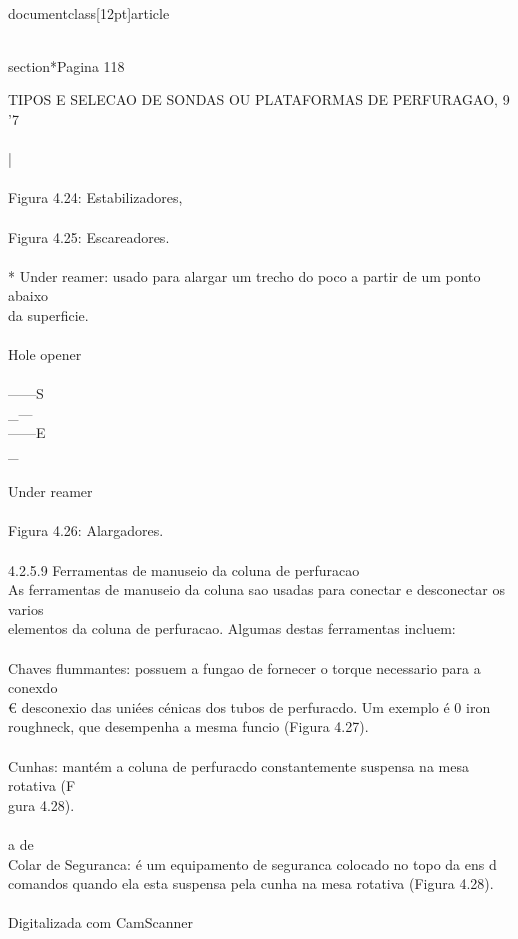 \\documentclass[12pt]{article}
\begin{document}
\\section*{Pagina 118}

TIPOS E SELECAO DE SONDAS OU PLATAFORMAS DE PERFURAGAO, 9\\
'7\\
\\
|\\
\\
Figura 4.24: Estabilizadores,\\
\\
Figura 4.25: Escareadores.\\
\\
* Under reamer: usado para alargar um trecho do poco a partir de um ponto abaixo\\
da superficie.\\
\\
Hole opener\\
\\
——S\\_—\\
——E\\_\\
\\
Under reamer\\
\\
Figura 4.26: Alargadores.\\
\\
4.2.5.9 Ferramentas de manuseio da coluna de perfuracao\\
As ferramentas de manuseio da coluna sao usadas para conectar e desconectar os varios\\
elementos da coluna de perfuracao. Algumas destas ferramentas incluem:\\
\\
Chaves flummantes: possuem a fungao de fornecer o torque necessario para a conexdo\\
€ desconexio das uniées cénicas dos tubos de perfuracdo. Um exemplo é 0 iron\\
roughneck, que desempenha a mesma funcio (Figura 4.27).\\
\\
Cunhas: mantém a coluna de perfuracdo constantemente suspensa na mesa rotativa (F\\
gura 4.28).\\
\\
a de\\
Colar de Seguranca: é um equipamento de seguranca colocado no topo da ens d\\
comandos quando ela esta suspensa pela cunha na mesa rotativa (Figura 4.28).\\
\\
Digitalizada com CamScanner\\
\end{document}
